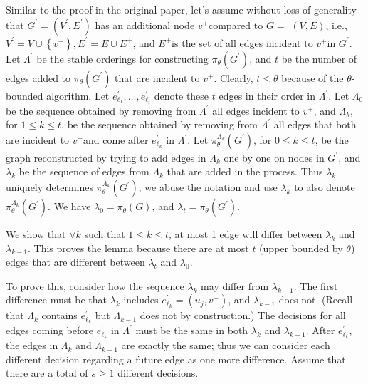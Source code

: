 Similar to the proof in the original paper, let's assume without loss of generality that
$G^{\prime}=\left(V^{\prime}, E^{\prime}\right)$ has an additional node $v^{+}$compared to $G=$ $(V, E)$, i.e., $V^{\prime}=V \cup\left\{v^{+}\right\}, E^{\prime}=E \cup E^{+}$, and $E^{+}$is the set of all edges incident to $v^{+}$in $G^{\prime}$. Let $\Lambda^{\prime}$ be the stable orderings for constructing $\pi_\theta\left(G^{\prime}\right)$, and $t$ be the number of edges added to $\pi_\theta\left(G^{\prime}\right)$ that are incident to $v^{+}$. Clearly, $t \leq \theta$ because of the $\theta$-bounded algorithm. Let $e_{\ell_1}^{\prime}, \ldots, e_{\ell_t}^{\prime}$ denote these $t$ edges in their order in $\Lambda^{\prime}$. Let $\Lambda_0$ be the sequence obtained by removing from $\Lambda^{\prime}$ all edges incident to $v^{+}$, and $\Lambda_k$, for $1 \leq k \leq t$, be the sequence obtained by removing from $\Lambda^{\prime}$ all edges that both are incident to $v^{+}$and come after $e_{\ell_k}^{\prime}$ in $\Lambda^{\prime}$. Let $\pi_\theta^{\Lambda_k}\left(G^{\prime}\right)$, for $0 \leq k \leq t$, be the graph reconstructed by trying to add edges in $\Lambda_k$ one by one on nodes in $G^{\prime}$, and $\lambda_k$ be the sequence of edges from $\Lambda_k$ that are added in the process. Thus $\lambda_k$ uniquely determines $\pi_\theta^{\Lambda_k}\left(G^{\prime}\right)$; we abuse the notation and use $\lambda_k$ to also denote $\pi_\theta^{\Lambda_k}\left(G^{\prime}\right)$. We have $\lambda_0=\pi_\theta(G)$, and $\lambda_t=\pi_\theta\left(G^{\prime}\right)$.

We show that $\forall k$ such that $1 \leq k \leq t$, at most 1 edge will differ between $\lambda_k$ and $\lambda_{k-1}$. This proves the lemma because there are at most $t$ (upper bounded by $\theta$) edges that are different between $\lambda_t$ and $\lambda_0$.

To prove this, consider how the sequence $\lambda_k$ may differ from $\lambda_{k-1}$. The first difference must be that $\lambda_k$ includes $e_{\ell_k}^{\prime}=\left(u_j, v^{+}\right)$, and $\lambda_{k-1}$ does not. (Recall that $\Lambda_k$ contains $e_{\ell_k}^{\prime}$ but $\Lambda_{k-1}$ does not by construction.) The decisions for all edges coming before $e_{\ell_k}^{\prime}$ in $\Lambda^{\prime}$ must be the same in both $\lambda_k$ and $\lambda_{k-1}$. After $e_{\ell_k}^{\prime}$, the edges in $\Lambda_k$ and $\Lambda_{k-1}$ are exactly the same; thus we can consider each different decision regarding a future edge as one more difference. Assume that there are a total of $s \geq 1$ different decisions.

